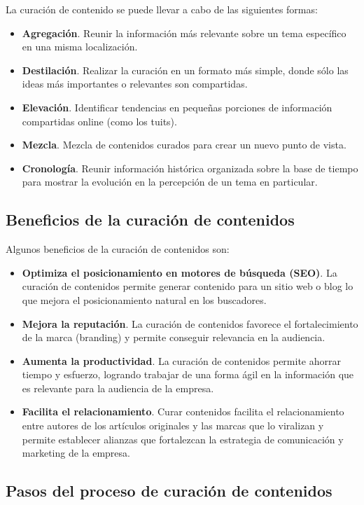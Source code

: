 La curación de contenido se puede llevar a cabo de las siguientes formas:
\begin{itemize}
    \item \textbf{Agregación}. Reunir la información más relevante sobre un tema específico en una misma localización.
    \item \textbf{Destilación}. Realizar la curación en un formato más simple, donde sólo las ideas más importantes o relevantes son compartidas.
    \item \textbf{Elevación}. Identificar tendencias en pequeñas porciones de información compartidas online (como los tuits).
    \item \textbf{Mezcla}. Mezcla de contenidos curados para crear un nuevo punto de vista.
    \item \textbf{Cronología}. Reunir información histórica organizada sobre la base de tiempo para mostrar la evolución en la percepción de un tema en particular.
\end{itemize}

\subsection{Beneficios de la curación de contenidos}

Algunos beneficios de la curación de contenidos son:

\begin{itemize}
    \item \textbf{Optimiza el posicionamiento en motores de búsqueda (SEO)}. La curación de contenidos permite generar contenido para un sitio web o blog lo que mejora el posicionamiento natural en los buscadores.
    \item \textbf{Mejora la reputación}. La curación de contenidos favorece el fortalecimiento de la marca (branding) y permite conseguir relevancia en la audiencia.
    \item \textbf{Aumenta la productividad}. La curación de contenidos permite ahorrar tiempo y esfuerzo, logrando trabajar de una forma ágil en la información que es relevante para la audiencia de la empresa.
    \item \textbf{Facilita el relacionamiento}. Curar contenidos facilita el relacionamiento entre autores de los artículos originales y las marcas que lo viralizan y permite establecer alianzas que fortalezcan la estrategia de comunicación y marketing de la empresa.
\end{itemize}

\subsection{Pasos del proceso de curación de contenidos}

